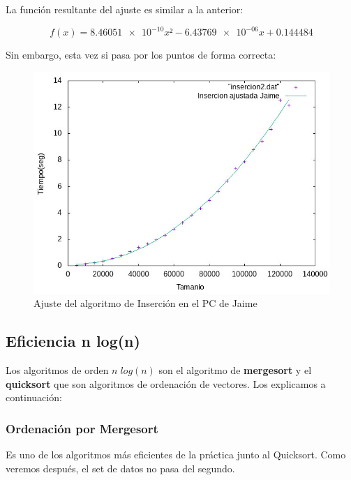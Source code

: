 \documentclass[12pt, spanish]{article}
\begin{document}
La función resultante del ajuste es similar a la anterior:

\[f(x) = \num{8.46051e-10}x² - \num{6.43769e-06}x + 0.144484\]

\newpage

Sin embargo, esta vez si pasa por los puntos de forma correcta:
\begin{figure}[H]
  \centering
  \includegraphics[scale = 1]{AjusteJaime.png}
  \caption{Ajuste del algoritmo de Inserción en el PC de Jaime}
\end{figure}


\subsection{Eficiencia n log(n)}
Los algoritmos de orden $n\;log(n)$ son el algoritmo de \textbf{mergesort} y el \textbf{quicksort} que son algoritmos de ordenación de vectores. Los explicamos a continuación:

\subsubsection{Ordenación por Mergesort}
Es uno de los algoritmos más eficientes de la práctica junto al Quicksort. Como veremos después, el set de datos no pasa del segundo.

\newpage
\end{document}

